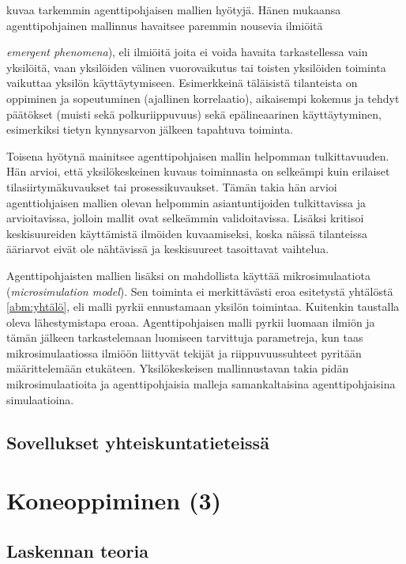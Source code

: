 \documentclass[finnish,gradu,twoside,12pt]{tktltiki}
\begin{document}
\citet{Bonabeau2002} kuvaa tarkemmin agenttipohjaisen mallien hyötyjä. Hänen mukaansa agenttipohjainen mallinnus havaitsee paremmin nousevia ilmiöitä {\textit{emergent phenomena}), eli ilmiöitä joita ei voida havaita tarkastellessa vain yksilöitä, vaan yksilöiden välinen vuorovaikutus tai toisten yksilöiden toiminta vaikuttaa yksilön käyttäytymiseen. Esimerkkeinä täläisistä tilanteista on oppiminen ja sopeutuminen (ajallinen korrelaatio), aikaisempi kokemus ja tehdyt päätökset (muisti sekä polkuriippuvuus) sekä epälineaarinen käyttäytyminen, esimerkiksi tietyn kynnysarvon jälkeen tapahtuva toiminta.

Toisena hyötynä \citet{Bonabeau2002} mainitsee agenttipohjaisen mallin helpomman tulkittavuuden. Hän arvioi, että yksilökeskeinen kuvaus toiminnasta on selkeämpi kuin erilaiset tilasiirtymäkuvaukset tai prosessikuvaukset. Tämän takia hän arvioi agenttiohjaisen mallien olevan helpommin asiantuntijoiden tulkittavissa ja arvioitavissa, jolloin mallit ovat selkeämmin validoitavissa. Lisäksi \citet{Bonabeau2002} kritisoi keskisuureiden käyttämistä ilmöiden kuvaamiseksi, koska näissä tilanteissa ääriarvot eivät ole nähtävissä ja keskisuureet tasoittavat vaihtelua.

Agenttipohjaisten mallien lisäksi on mahdollista käyttää mikrosimulaatiota  (\textit{microsimulation model}). Sen toiminta ei merkittävästi eroa esitetystä yhtälöstä \ref{abm:yhtälö}, eli malli pyrkii ennustamaan yksilön toimintaa. Kuitenkin taustalla oleva lähestymistapa eroaa. Agenttipohjaisen malli pyrkii luomaan ilmiön ja tämän jälkeen tarkastelemaan luomiseen tarvittuja parametreja, kun taas mikrosimulaatiossa ilmiöön liittyvät tekijät ja riippuvuussuhteet pyritään määrittelemään etukäteen.  Yksilökeskeisen mallinnustavan takia pidän mikrosimulaatioita ja agenttipohjaisia malleja samankaltaisina agenttipohjaisina simulaatioina.

\subsection{Sovellukset yhteiskuntatieteissä}

\citet{VonRandow2011}

\newpage

\section{Koneoppiminen (3)}

\subsection{Laskennan teoria}

}
\end{document}
